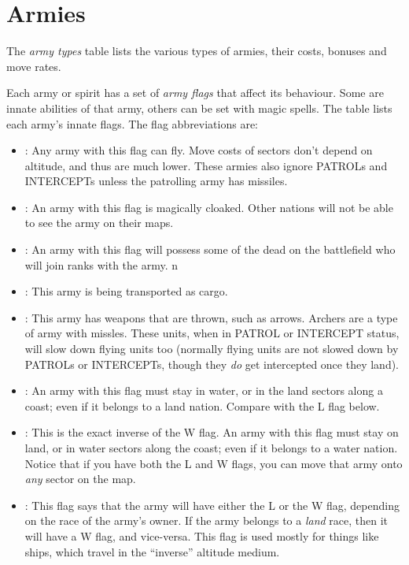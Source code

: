 \section{Armies}
The {\em army types} table lists the various types of armies, their
costs, bonuses and move rates.

Each army or spirit has a set of {\em army flags} that affect its
behaviour.  Some are innate abilities of that army, others can be set
with magic spells.  The table lists each army's innate flags.  The
flag abbreviations are:
\begin{itemize}
\item
{}: Any army with this flag can fly.  Move costs of sectors
don't depend on altitude, and thus are much lower.  These armies also
ignore PATROLs and INTERCEPTs unless the patrolling army has missiles.
\item
{}: An army with this flag is magically cloaked.  Other
nations will not be able to see the army on their maps.
\item
{}: An army with this flag will possess some of the
dead on the battlefield who will join ranks with the army.
n\item
{}: This army is being transported as cargo.
\item
{}: This army has weapons that are thrown, such as
arrows. Archers are a type of army with missles.  These units, when
in PATROL or INTERCEPT status, will slow down flying units too
(normally flying units are not slowed down by PATROLs or INTERCEPTs,
though they {\em do} get intercepted once they land).
\item
{}: An army with this flag must stay in water, or in the land
sectors along a coast; even if it belongs to a land nation.  Compare
with the L flag below.
\item
{}: This is the exact inverse of the W flag.  An army with
this flag must stay on land, or in water sectors along the coast; even
if it belongs to a water nation.  Notice that if you have both the
L and W flags, you can move that army onto {\em any} sector on the
map.
\item
{}: This flag says that the army will have either
the L or the W flag, depending on the race of the army's owner.  If
the army belongs to a {\em land} race, then it will have a W flag,
and vice-versa.  This flag is used mostly for things like ships,
which travel in the ``inverse'' altitude medium.

\end{itemize}
